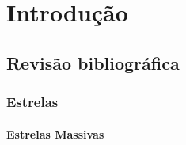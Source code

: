 \chapter{Introdução}
\section{Revisão bibliográfica}
\lipsum[1]
\subsection{Estrelas}
\lipsum[2]

\subsubsection{Estrelas Massivas}
\lipsum[3]
